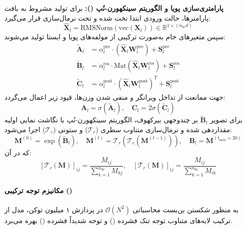 \textbf{پارامتری‌سازی پویا و الگوریتم سینکهورن-نُپ ():}
برای تولید مشروط به بافت پارامترها، حالت ورودی ابتدا تخت شده و تحت نرمال‌سازی قرار می‌گیرد:
\begin{equation}
    \hat{\mathbf{X}}_l = \text{RMSNorm}(\text{vec}(\mathbf{X}_l)) \in \mathbb{R}^{1 \times (n_{\text{hc}} d)}
\end{equation}
سپس متغیرهای خام به‌صورت ترکیبی از مولفه‌های پویا و ایستا تولید می‌شوند:
\begin{align}
    \tilde{\mathbf{A}}_l &= \alpha_l^{\text{pre}} \cdot (\hat{\mathbf{X}}_l \mathbf{W}_l^{\text{pre}}) + \mathbf{S}_l^{\text{pre}} \\
    \tilde{\mathbf{B}}_l &= \alpha_l^{\text{res}} \cdot \text{Mat}(\hat{\mathbf{X}}_l \mathbf{W}_l^{\text{res}}) + \mathbf{S}_l^{\text{res}} \\
    \tilde{\mathbf{C}}_l &= \alpha_l^{\text{post}} \cdot (\hat{\mathbf{X}}_l \mathbf{W}_l^{\text{post}})^T + \mathbf{S}_l^{\text{post}}
\end{align}
جهت ممانعت از تداخل ویرانگر و منفی شدن وزن‌ها، قیود زیر اعمال می‌گردد:
\begin{equation}
    \mathbf{A}_l = \sigma(\tilde{\mathbf{A}}_l), \quad \mathbf{C}_l = 2\sigma(\tilde{\mathbf{C}}_l)
\end{equation}
برای تصویر $\tilde{\mathbf{B}}_l$ بر چندوجهی بیرکهوف، الگوریتم سینکهورن-نُپ با نگاشت نمایی اولیه مقداردهی شده و نرمال‌سازی متناوب سطری ($\mathcal{T}_r$) و ستونی ($\mathcal{T}_c$) اجرا می‌شود:
\begin{equation}
    \mathbf{M}^{(0)} = \exp(\tilde{\mathbf{B}}_l), \quad \mathbf{M}^{(t)} = \mathcal{T}_r\left(\mathcal{T}_c\left(\mathbf{M}^{(t-1)}\right)\right), \quad \mathbf{B}_l = \mathbf{M}^{(t_{\max}=20)}
\end{equation}
که در آن:
\begin{equation}
    \left[\mathcal{T}_c(\mathbf{M})\right]_{ij} = \frac{M_{ij}}{\sum_{k=1}^{n_{\text{hc}}} M_{kj}}, \quad \left[\mathcal{T}_r(\mathbf{M})\right]_{ij} = \frac{M_{ij}}{\sum_{k=1}^{n_{\text{hc}}} M_{ik}}
\end{equation}

\paragraph*{مکانیزم توجه ترکیبی ()}
به منظور شکستن بن‌بست محاسباتی $\mathcal{O}(N^2)$ در پردازش ۱ میلیون توکن، مدل از ترکیب لایه‌های متناوب توجه تنک فشرده () و توجه شدیداً فشرده () بهره می‌برد.

